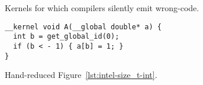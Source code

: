 \lstset{language=[OpenCL]C}
\begin{figure}
	\centering %
	\\%
	\\%
	\caption{Kernels for which compilers silently emit wrong-code.}%
\label{lst:compiler-crashes}%
\end{figure}


\begin{figure}
\begin{lstlisting}
__kernel void A(__global double* a) {
  int b = get_global_id(0);
  if (b < - 1) { a[b] = 1; }
}
\end{lstlisting}
\label{lst:intel-size_t-int-reduced}
\caption{Hand-reduced Figure~\ref{lst:intel-size_t-int}.}
\end{figure}